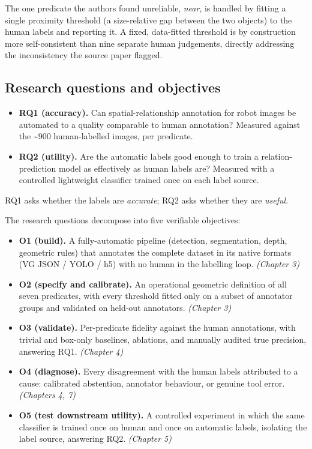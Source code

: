 The one predicate the authors found unreliable, \textit{near}, is handled by fitting a single proximity threshold (a size-relative gap between the two objects) to the human labels and reporting it. A fixed, data-fitted threshold is by construction more self-consistent than nine separate human judgements, directly addressing the inconsistency the source paper flagged.

\subsection{Research questions and objectives}

\begin{itemize}
\item \textbf{RQ1 (accuracy).} Can spatial-relationship annotation for robot images be
automated to a quality comparable to human annotation? Measured against the \textasciitilde{}900 human-labelled images, per predicate.
\item \textbf{RQ2 (utility).} Are the automatic labels good enough to train a
relation-prediction model as effectively as human labels are? Measured with a controlled lightweight classifier trained once on each label source.
\end{itemize}

RQ1 asks whether the labels are \textit{accurate}; RQ2 asks whether they are \textit{useful}.

The research questions decompose into five verifiable objectives:

\begin{itemize}
\item \textbf{O1 (build).} A fully-automatic pipeline (detection, segmentation, depth,
geometric rules) that annotates the complete dataset in its native formats (VG JSON / YOLO / h5) with no human in the labelling loop. \textit{(Chapter 3)}
\item \textbf{O2 (specify and calibrate).} An operational geometric definition of all
seven predicates, with every threshold fitted only on a subset of annotator groups and validated on held-out annotators. \textit{(Chapter 3)}
\item \textbf{O3 (validate).} Per-predicate fidelity against the human annotations,
with trivial and box-only baselines, ablations, and manually audited true precision, answering RQ1. \textit{(Chapter 4)}
\item \textbf{O4 (diagnose).} Every disagreement with the human labels attributed to a
cause: calibrated abstention, annotator behaviour, or genuine tool error. \textit{(Chapters 4, 7)}
\item \textbf{O5 (test downstream utility).} A controlled experiment in which the same
classifier is trained once on human and once on automatic labels, isolating the label source, answering RQ2. \textit{(Chapter 5)}
\end{itemize}

